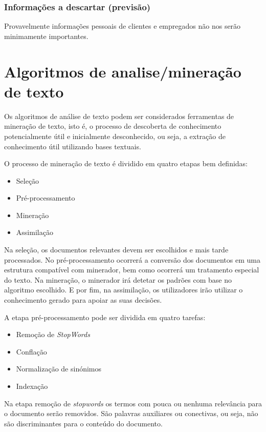 \documentclass[a4paper,10pt]{article}
\begin{document}
\subsubsection{Informações a descartar (previsão)}

Provavelmente informações pessoais de clientes e empregados não nos serão minimamente importantes.

\section{Algoritmos de analise/mineração de texto}

Os algoritmos de análise de texto podem ser considerados ferramentas de mineração de texto, isto é, o processo de descoberta de conhecimento potencialmente útil e inicialmente desconhecido, ou seja, a extração de conhecimento útil utilizando bases textuais.

O processo de mineração de texto é dividido em quatro etapas bem definidas:
\begin{itemize}
    \item Seleção
    \item Pré-processamento
    \item Mineração
    \item Assimilação
\end{itemize}

Na seleção, os documentos relevantes devem ser escolhidos e mais tarde processados.
No pré-processamento ocorrerá a conversão dos documentos em uma estrutura compatível com minerador, bem como ocorrerá um tratamento especial do texto.
Na mineração, o minerador irá detetar os padrões com base no algoritmo escolhido.
E por fim, na assimilação, os utilizadores irão utilizar o conhecimento gerado para apoiar as suas decisões.

A etapa pré-processamento pode ser dividida em quatro tarefas:
\begin{itemize}
    \item Remoção de \textit{StopWords}
    \item Conflação
    \item Normalização de sinónimos
    \item Indexação
\end{itemize}

Na etapa remoção de \textit{stopwords} os termos com pouca ou nenhuma relevância para o documento serão removidos.
São palavras auxiliares ou conectivas, ou seja, não são discriminantes para o conteúdo do documento.
\end{document}
